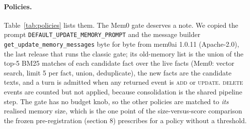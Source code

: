 \documentclass{ceurart}
\newcommand{\code}[1]{\texttt{#1}}
\begin{document}
\paragraph{Policies.}
\label{sec:policies}
Table~\ref{tab:policies} lists them. The Mem0 gate deserves a note. We copied the prompt \code{DEFAULT\_UPDATE\_\allowbreak MEMORY\_PROMPT} and the message builder \code{get\_update\_\allowbreak memory\_messages} byte for byte from mem0ai 1.0.11 (Apache-2.0), the last release that runs the classic gate; its old-memory list is the union of the top-5 BM25 matches of each candidate fact over the live facts (Mem0: vector search, limit 5 per fact, union, deduplicate), the new facts are the candidate texts, and a turn is admitted when any returned event is \textsc{add} or \textsc{update}. \textsc{delete} events are counted but not applied, because consolidation is the shared pipeline step. The gate has no budget knob, so the other policies are matched to \emph{its} realised memory size, which is the one point of the size-versus-score comparison the frozen pre-registration (section 8) prescribes for a policy without a threshold.
\end{document}
